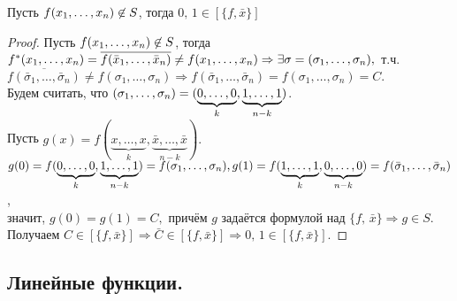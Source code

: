 \begin{lemma}  Пусть $f(x_1, \ldots, x_n)\not\in S$, тогда $0,\,1 \in [\{f, \bar{x}\}]$
\end{lemma}
\begin{proof} 
    Пусть $f(x_1, \ldots, x_n)\not\in S$, тогда  $f^*(x_1, \ldots, x_n) = \overline{f(\bar{x}_1,\ldots,\bar{x}_n)} \neq f(x_1, \ldots, x_n) \Rightarrow \exists \sigma = (\sigma_1,\ldots,\sigma_n),$ т.ч. $\overline{f(\bar{\sigma}_1,\ldots,\bar{\sigma}_n)} \neq f(\sigma_1,\ldots,\sigma_n) \Rightarrow f(\bar{\sigma}_1,\ldots,\bar{\sigma}_n) = f(\sigma_1,\ldots,\sigma_n) = C.$\\
    Будем считать, что $(\sigma_1, \ldots, \sigma_n) = (\underbrace{0,\ldots,0}_k,\underbrace{1,\ldots,1}_{n-k})$.\\
    Пусть $g(x) = f(\underbrace{x,\ldots,x}_k,\underbrace{ \bar{x},\ldots,\bar{x}}_{n-k}).$\\
    $g(0) = f(\underbrace{0,\ldots,0}_k,\underbrace{ 1,\ldots,1}_{n-k}) = f(\sigma_1, \ldots, \sigma_n),\\
    g(1)= f(\underbrace{1,\ldots,1}_k,\underbrace{ 0,\ldots,0}_{n-k}) = f(\bar{\sigma}_1,\ldots,\bar{\sigma}_n)$,\\ значит, 
    $g(0) = g(1) = C, $ причём $g$ задаётся формулой над $\{f,\,\bar{x}\} \Rightarrow g \in S$.\\
    Получаем $C \in  [\{f, \bar{x}\}] \Rightarrow \bar{C} \in [\{f, \bar{x}\}] \Rightarrow 0,\,1 \in [\{f, \bar{x}\}].$
\end{proof}

\subsection{Линейные функции.}